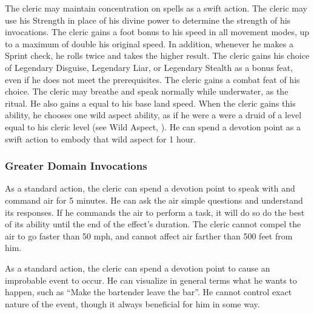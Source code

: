             The cleric may maintain concentration on  spells as a swift action.
            The cleric may use his Strength in place of his divine power to determine the strength of his invocations.
            The cleric gains a  foot bonus to his speed in all movement modes, up to a maximum of double his original speed.
            In addition, whenever he makes a Sprint check, he rolls twice and takes the higher result.
            The cleric gains his choice of Legendary Disguise, Legendary Liar, or Legendary Stealth as a bonus feat, even if he does not meet the prerequisites.
            The cleric gains a combat feat of his choice.
             The cleric may breathe and speak normally while underwater, as the 
            ritual.
            He also gains a  equal to his base land speed.
            When the cleric gains this ability, he chooses one wild aspect ability, as if he were a were a druid of a level equal to his cleric level (see Wild Aspect, ).
            He can spend a devotion point as a swift action to embody that wild aspect for 1 hour.

        \subsubsection{Greater Domain Invocations}\label{Greater Domain Invocations}

            As a standard action, the cleric can spend a devotion point to speak with and command air for 5 minutes.
            He can ask the air simple questions and understand its responses.
            If he commands the air to perform a task, it will do so do the best of its ability until the end of the effect's duration.
            The cleric cannot compel the air to go faster than 50 mph, and cannot affect air farther than 500 feet from him.

            As a standard action, the cleric can spend a devotion point to cause an improbable event to occur.
            He can visualize in general terms what he wants to happen, such as ``Make the bartender leave the bar''.
            He cannot control exact nature of the event, though it always beneficial for him in some way.

